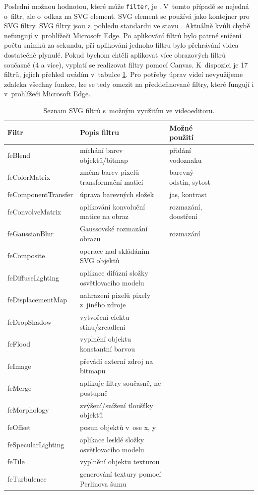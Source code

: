 Poslední možnou hodnotou, které může \texttt{filter}, je . V~tomto případě se nejedná o~filtr, ale o~odkaz na SVG element. SVG element se používá jako kontejner pro SVG filtry. SVG filtry jsou z~pohledu standardu ve stavu . Aktuálně kvůli chybě nefungují v~prohlížeči Microsoft Edge. Po aplikování filtrů bylo patrné snížení počtu snímků za sekundu, při aplikování jednoho filtru bylo přehrávání videa dostatečně plynulé. Pokud bychom chtěli aplikovat více obrazových filtrů současně (4 a více), vyplatí se realizovat filtry pomocí Canvas. K~dispozici je 17 filtrů, jejich přehled uvádím v~tabulce \ref{tab:svg}. Pro potřeby úprav videí nevyužijeme zdaleka všechny funkce, lze se tedy omezit na předdefinované filtry, které fungují i v~prohlížeči Microsoft Edge.
\begin{table}[h]
    \centering
    \begin{tabular}{|l|l|l|l|l|l|l|l|}
    \hline
    Filtr   & Popis filtru & Možné použití \\
    \hline
    feBlend & míchání barev objektů/bitmap & přidání vodoznaku \\
    feColorMatrix & změna barev pixelů transformační maticí & barevný odstín, sytost \\
    feComponentTransfer & úprava barevných složek & jas, kontrast \\
    feConvolveMatrix & aplikování konvoluční matice na obraz & rozmazání, doostření \\
    feGaussianBlur & Gaussovské rozmazání obrazu & rozmazání \\
    feComposite & operace nad skládáním SVG objektů & \\
    feDiffuseLighting & aplikace difúzní složky osvětlovacího modelu & \\
    feDisplacementMap & nahrazení pixelů pixely z~jiného zdroje & \\
    feDropShadow & vytvoření efektu stínu/zrcadlení & \\
    feFlood & vyplnění objektu konstantní barvou & \\
    feImage & převádí externí zdroj na bitmapu & \\
    feMerge & aplikuje filtry současně, ne postupně & \\
    feMorphology & zvýšení/snížení tloušťky objektů & \\
    feOffset & posun objektů v~ose x, y & \\
    feSpecularLighting & aplikace lesklé složky osvětlovacího modelu & \\
    feTile & vyplnění objektu texturou & \\
    feTurbulence & generování textury pomocí Perlinova šumu & \\
    \hline
    \end{tabular}
    \caption{Seznam SVG filtrů s~možným využitím ve videoeditoru.}
    \label{tab:svg}
\end{table}

